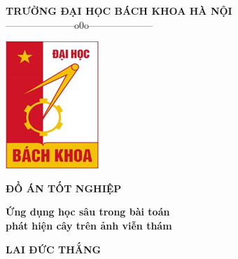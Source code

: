 \documentclass[a4paper, 12pt]{report}
\begin{document}
	\begin{titlepage} %


			\begin{center}
				
				{\large\bf TRƯỜNG ĐẠI HỌC BÁCH KHOA HÀ NỘI}\\
				
				
				{———————o0o——————–}
				\vskip 1cm
				\begin{center}
     				\includegraphics[scale=.85]{Images/biaDA.png}
				\end{center}
				
				\fontsize{25pt}{0.15cm}\selectfont
				\textbf{ĐỒ ÁN TỐT NGHIỆP}
				
				
				\vspace{1.5cm}
				\fontsize{23pt}{0.15cm}\selectfont 
				\textbf{Ứng dụng học sâu trong bài toán \\
				phát hiện cây trên ảnh viễn thám} 
				
	
				\vspace{1cm}
				\fontsize{14pt}{0.15cm}\selectfont
				\textbf{LAI ĐỨC THẮNG}
				
				\vspace{0.3cm}
				\fontsize{13pt}{0.15cm}\selectfont


\end{center}
\end{titlepage}
\end{document}
